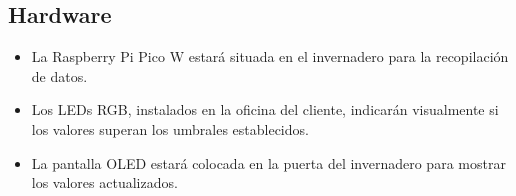 \begin{itemize}
\begin{itemize}





\subsection{Hardware}
\begin{itemize}
	\item La Raspberry Pi Pico W estará situada en el invernadero para la recopilación de datos.
	\item Los LEDs RGB, instalados en la oficina del cliente, indicarán visualmente si los valores superan los umbrales establecidos.
	\item La pantalla OLED estará colocada en la puerta del invernadero para mostrar los valores actualizados.
\end{itemize}


\end{itemize}
\end{itemize}
